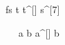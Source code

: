 \begin{eqcode}{f}{s}{}{}
  t \in {} \lend
  t^{[\iter]} \gets  s^{[7]} \lend
   \lend
\end{eqcode}

\begin{eqcode}{\mu}{\ }{\ }{}
  a \in {} \lend
  b  \lend
  a^{[\iter]} \gets \iter \cdot \iter \cdot b \lend
   \lend
   \lend
\end{eqcode}
